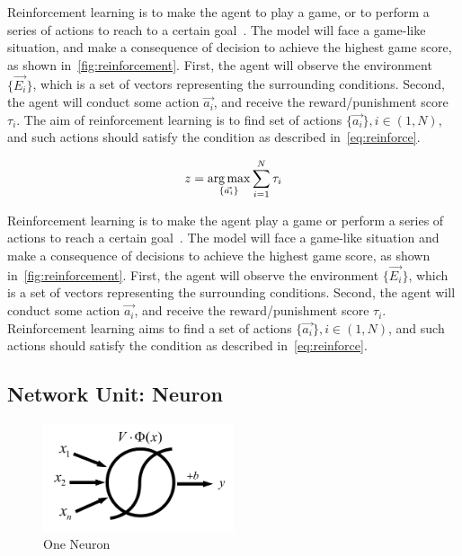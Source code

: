 \begin{spacing}{1.5}
Reinforcement learning is to make the agent to play a game, or to perform a series of actions to reach to a certain goal~\cite{barto2004reinforcement}. The model will face a game-like situation, and make a consequence of decision to achieve the highest game score, as shown in~\autoref{fig:reinforcement}. First, the agent will observe the environment $\{\vec{E_i}\}$, which is a set of vectors representing the surrounding conditions. Second, the agent will conduct some action $\vec{a_i}$, and receive the reward/punishment score $\tau_i$. The aim of reinforcement learning is to find set of actions $\{\vec{a_i}\}, i \in (1,N)$, and such actions should satisfy the condition as described in~\autoref{eq:reinforce}.

\begin{equation}
\label{eq:reinforce}
   z = \operatorname*{arg\,max}_{\{\vec{a_i}\}} \sum_{i=1}^{N} \tau_i
\end{equation}

Reinforcement learning is to make the agent play a game or perform a series of actions to reach a certain goal~\cite{barto2004reinforcement}. The model will face a game-like situation and make a consequence of decisions to achieve the highest game score, as shown in~\autoref{fig:reinforcement}. First, the agent will observe the environment $\{\vec{E_i}\}$, which is a set of vectors representing the surrounding conditions. Second, the agent will conduct some action $\vec{a_i}$, and receive the reward/punishment score $\tau_i$. Reinforcement learning aims to find a set of actions $\{\vec{a_i}\}, i \in (1,N)$, and such actions should satisfy the condition as described in~\autoref{eq:reinforce}.

\subsection{Network Unit: Neuron}
\label{subsec:neural_unit}

\begin{figure}[ht]
\centering
\includegraphics[width=0.5\textwidth, fbox]{Chapter2/neuralunit.pdf}
\caption{One Neuron}
\label{fig:neuralunit} 
\end{figure}


\end{spacing}
